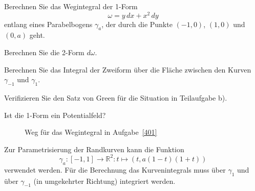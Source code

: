 Berechnen Sie das Wegintegral der 1-Form
\[
\omega
=
y
\,dx
+
x^2
\,dy
\]
entlang eines Parabelbogens $\gamma_a$, der durch die Punkte
$(-1,0)$, $(1,0)$ und $(0,a)$ geht.
\begin{teilaufgaben}
\item Berechnen Sie die 2-Form $d\omega$.
\item Berechnen Sie das Integral der Zweiform über die Fläche zwischen
den Kurven $\gamma_{-1}$ und $\gamma_1$.
\item Verifizieren Sie den Satz von Green für die Situation in Teilaufgabe b).
\item Ist die 1-Form ein Potentialfeld?
\end{teilaufgaben}

\begin{figure}[h]
\centering
{}
\caption{Weg für das Wegintegral in Aufgabe~\ref{401}
\label{buch:401:fig}}
\end{figure}

\begin{hinweis}
Zur Parametrisierung der Randkurven kann die Funktion
\[
\gamma_a
\colon
[-1,1] \to \mathbb{R}^2
:
t
\mapsto
(t, a(1-t)(1+t))
\]
verwendet werden.
Für die Berechnung das Kurvenintegrals muss über $\gamma_1$ und über
$\gamma_{-1}$ (in umgekehrter Richtung) integriert werden.
\end{hinweis}

